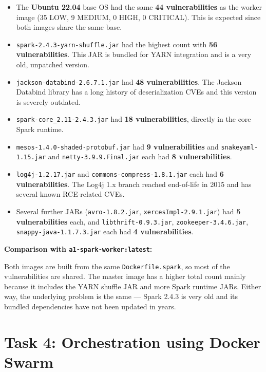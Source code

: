 \documentclass[11pt,a4paper]{article}
\begin{document}
\begin{itemize}[leftmargin=1.5cm]
  \item The \textbf{Ubuntu 22.04} base OS had the same \textbf{44
        vulnerabilities} as the worker image (35 LOW, 9 MEDIUM, 0 HIGH,
        0 CRITICAL). This is expected since both images share the same base.
  \item \texttt{spark-2.4.3-yarn-shuffle.jar} had the highest count with
        \textbf{56 vulnerabilities}. This JAR is bundled for YARN integration
        and is a very old, unpatched version.
  \item \texttt{jackson-databind-2.6.7.1.jar} had \textbf{48
        vulnerabilities}. The Jackson Databind library has a long history of
        deserialization CVEs and this version is severely outdated.
  \item \texttt{spark-core\_2.11-2.4.3.jar} had \textbf{18 vulnerabilities},
        directly in the core Spark runtime.
  \item \texttt{mesos-1.4.0-shaded-protobuf.jar} had \textbf{9
        vulnerabilities} and \texttt{snakeyaml-1.15.jar} and
        \texttt{netty-3.9.9.Final.jar} each had \textbf{8 vulnerabilities}.
  \item \texttt{log4j-1.2.17.jar} and \texttt{commons-compress-1.8.1.jar}
        each had \textbf{6 vulnerabilities}. The Log4j 1.x branch reached
        end-of-life in 2015 and has several known RCE-related CVEs.
  \item Several further JARs (\texttt{avro-1.8.2.jar},
        \texttt{xercesImpl-2.9.1.jar}) had \textbf{5 vulnerabilities} each,
        and \texttt{libthrift-0.9.3.jar}, \texttt{zookeeper-3.4.6.jar},
        \texttt{snappy-java-1.1.7.3.jar} each had \textbf{4 vulnerabilities}.
\end{itemize}

\textbf{Comparison with \texttt{a1-spark-worker:latest}:}

Both images are built from the same \texttt{Dockerfile.spark}, so most of the
vulnerabilities are shared. The master image has a higher total count mainly
because it includes the YARN shuffle JAR and more Spark runtime JARs. Either
way, the underlying problem is the same --- Spark 2.4.3 is very old and its
bundled dependencies have not been updated in years.



\section{Task 4: Orchestration using Docker Swarm}
\end{document}

